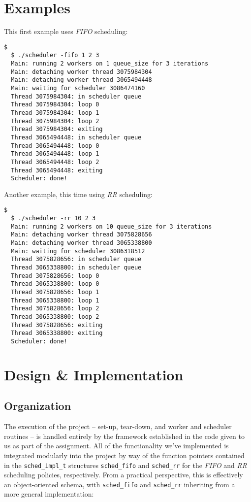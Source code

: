 \documentclass[paper=a4, fontsize=11pt]{scrartcl}
\begin{document}
\section*{Examples}
This first example uses \textit{FIFO} scheduling:
\begin{lstlisting}[style=ShellStyle]$
  $ ./scheduler -fifo 1 2 3
  Main: running 2 workers on 1 queue_size for 3 iterations
  Main: detaching worker thread 3075984304
  Main: detaching worker thread 3065494448
  Main: waiting for scheduler 3086474160
  Thread 3075984304: in scheduler queue
  Thread 3075984304: loop 0
  Thread 3075984304: loop 1
  Thread 3075984304: loop 2
  Thread 3075984304: exiting
  Thread 3065494448: in scheduler queue
  Thread 3065494448: loop 0
  Thread 3065494448: loop 1
  Thread 3065494448: loop 2
  Thread 3065494448: exiting
  Scheduler: done!
\end{lstlisting}
\pagebreak
Another example, this time using \textit{RR} scheduling:
\begin{lstlisting}[style=ShellStyle]$
  $ ./scheduler -rr 10 2 3
  Main: running 2 workers on 10 queue_size for 3 iterations
  Main: detaching worker thread 3075828656
  Main: detaching worker thread 3065338800
  Main: waiting for scheduler 3086318512
  Thread 3075828656: in scheduler queue
  Thread 3065338800: in scheduler queue
  Thread 3075828656: loop 0
  Thread 3065338800: loop 0
  Thread 3075828656: loop 1
  Thread 3065338800: loop 1
  Thread 3075828656: loop 2
  Thread 3065338800: loop 2
  Thread 3075828656: exiting
  Thread 3065338800: exiting
  Scheduler: done!
\end{lstlisting}

\section*{Design \& Implementation}
\subsection*{Organization}
The execution of the project -- set-up, tear-down, and worker and scheduler routines -- is handled entirely by the framework established in the code given to us as part of the assignment. All of the functionality we've implemented is integrated modularly into the project by way of the function pointers contained in the \texttt{sched\_impl\_t} structures \texttt{sched\_fifo} and \texttt{sched\_rr} for the \textit{FIFO} and \textit{RR} scheduling policies, respectively. From a practical perspective, this is effectively an object-oriented schema, with \texttt{sched\_fifo} and \texttt{sched\_rr} inheriting from a more general implementation:
\end{document}

